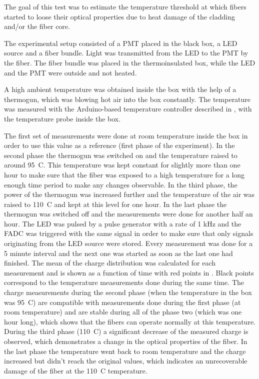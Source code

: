 The goal of this test was to estimate the temperature threshold at which fibers started to loose their optical properties
due to heat damage of the cladding and/or the fiber core.

The experimental setup consisted of a PMT placed in the black box, a LED source and a fiber bundle.
Light was transmitted from the LED to the PMT by the fiber.
The fiber bundle was placed in the thermoinsulated box, while the LED and the PMT were outside and not heated.

A high ambient temperature was obtained inside the box with the help of a thermogun, which was blowing hot air into the box constantly.
The temperature was measured with the Arduino-based temperature controller described in , with the temperature probe inside the box.

The first set of measurements were done at room temperature inside the box in order to use this value as a reference (first phase of the experiment).
In the second phase the thermogun was switched on and the temperature raised to around 95\degree~C.
This temperature was kept constant for slightly more than one hour to make sure that the fiber was exposed to a high temperature for
a long enough time period to make any changes observable. 
In the third phase, the power of the thermogun was increased further and the temperature of the air was raised to 110\degree~C and kept at this level for one hour.
In the last phase the thermogun was switched off and the measurements were done for another half an hour.
The LED was pulsed by a pulse generator with a rate of 1 kHz and the FADC was triggered 
with the same signal in order to make sure that only signals originating from the LED source were stored.
Every measurement was done for a 5 minute interval and the next one was started as soon as the last one had finished.
The mean of the charge distribution was calculated for each measurement and is shown as a function of time with red points in .
Black points correspond to the temperature measurements done during the same time.
The charge measurements during the second phase (when the temperature in the box was 95\degree~C) are compatible with measurements done during the first phase 
(at room temperature) and are stable during all of the phase two (which was one hour long), which shows that the fibers can operate normally at this temperature.
During the third phase (110\degree~C) a significant decrease of the measured charge is observed, which demonstrates a change in the
optical properties of the fiber. In the last phase the temperature went back to room temperature and the charge increased but didn't reach 
the original values, which indicates an unrecoverable damage of the fiber at the 110\degree~C temperature.

